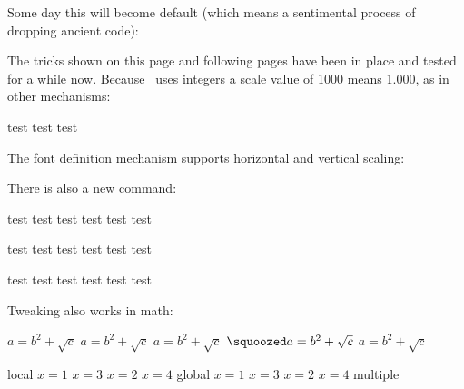 Some day this will become default (which means a sentimental process of dropping
ancient code):

\starttyping
{}
\stoptyping

\stoptitle

\starttitle[title=Details]

The tricks shown on this page and following pages have been in place and tested
for a while now. Because \TEX\ uses integers a scale value of 1000 means 1.000,
as in other mechanisms:

\startbuffer
{}%
test { test} test
\stopbuffer

\typebuffer {\getbuffer}


\page

The font definition mechanism supports horizontal and vertical scaling:

\startbuffer
{}

There is also a new command:


{\FooA test test \runwider test test \runtaller test test}\par
{\FooB test test \runwider test test \runtaller test test}\par
{\FooC test test \runwider test test \runtaller test test}\par
\stopbuffer

\typebuffer

\getbuffer

\page

Tweaking also works in math:

\startbuffer
{}

\startlines
$a = b^2 + \sqrt{c}$
{\squeezed $a = b^2 + \sqrt{c}$}
{\squoozed $a = b^2 + \sqrt{c}$}
{$\squoozed a = b^2 + \sqrt{c}$}
{$\scriptstyle a = b^2 + \sqrt{c}$}
\stoplines
\stopbuffer

\typebuffer

\getbuffer

\page

\startbuffer
{} {local}
    {\bTABLE[style=\squeezed]
        \bTR \bTD $x = 1$ \eTD \bTD  $x = 3$ \eTD \eTR
        \bTR \bTD $x = 2$ \eTD \bTD  $x = 4$ \eTD \eTR
     \eTABLE} {global}
    {\bTABLE[style=\squeezed\squeezed\squeezed\squeezed]
        \bTR \bTD $x = 1$ \eTD \bTD  $x = 3$ \eTD \eTR
        \bTR \bTD $x = 2$ \eTD \bTD  $x = 4$ \eTD \eTR
     \eTABLE} {multiple}
\stopcombination
\stopbuffer

